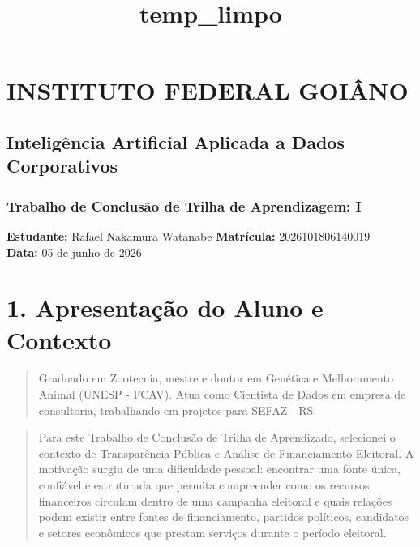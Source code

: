 \documentclass[11pt]{article}
\title{temp\_limpo}
\begin{document}
\setcounter{secnumdepth}{0}

    
    
    

    
    \section{INSTITUTO FEDERAL GOIÂNO}\label{instituto-federal-goiuxe2no}

\subsection{Inteligência Artificial Aplicada a Dados
Corporativos}\label{inteliguxeancia-artificial-aplicada-a-dados-corporativos}

\subsubsection{Trabalho de Conclusão de Trilha de Aprendizagem:
I}\label{trabalho-de-conclusuxe3o-de-trilha-de-aprendizagem-i}

\textbf{Estudante:} Rafael Nakamura Watanabe \textbf{Matrícula:}
2026101806140019\\
\textbf{Data:} 05 de junho de 2026

    \section{1. Apresentação do Aluno e
Contexto}\label{apresentauxe7uxe3o-do-aluno-e-contexto}

\begin{quote}
Graduado em Zootecnia, mestre e doutor em Genética e Melhoramento Animal
(UNESP - FCAV). Atua como Cientista de Dados em empresa de consultoria,
trabalhando em projetos para SEFAZ - RS.
\end{quote}

\begin{quote}
Para este Trabalho de Conclusão de Trilha de Aprendizado, selecionei o
contexto de Transparência Pública e Análise de Financiamento Eleitoral.
A motivação surgiu de uma dificuldade pessoal: encontrar uma fonte
única, confiável e estruturada que permita compreender como os recursos
financeiros circulam dentro de uma campanha eleitoral e quais relações
podem existir entre fontes de financiamento, partidos políticos,
candidatos e setores econômicos que prestam serviços durante o período
eleitoral.
\end{quote}
\end{document}
